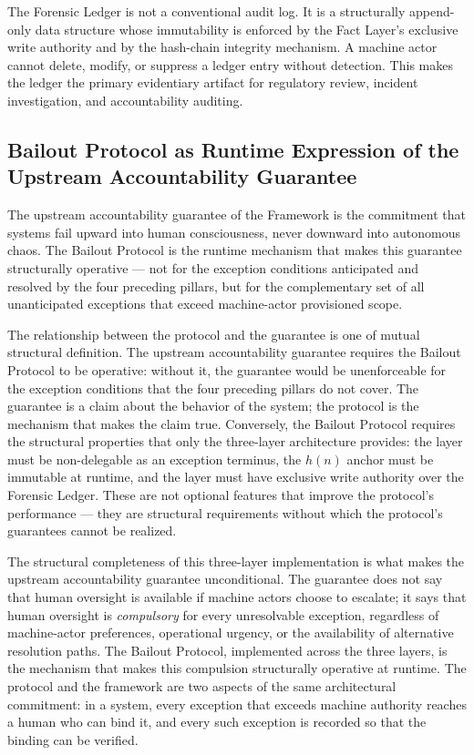 The Forensic Ledger is not a conventional audit log. It is a structurally append-only data structure whose immutability is enforced by the Fact Layer's exclusive write authority and by the hash-chain integrity mechanism. A machine actor cannot delete, modify, or suppress a ledger entry without detection. This makes the ledger the primary evidentiary artifact for regulatory review, incident investigation, and accountability auditing.

\subsection{Bailout Protocol as Runtime Expression of the Upstream Accountability Guarantee}\label{sec:runtime-expression}

The upstream accountability guarantee of the \bxthree{} Framework is the commitment that \bxthree{} systems fail upward into human consciousness, never downward into autonomous chaos. The Bailout Protocol is the runtime mechanism that makes this guarantee structurally operative — not for the exception conditions anticipated and resolved by the four preceding pillars, but for the complementary set of all unanticipated exceptions that exceed machine-actor provisioned scope.

The relationship between the protocol and the guarantee is one of mutual structural definition. The upstream accountability guarantee requires the Bailout Protocol to be operative: without it, the guarantee would be unenforceable for the exception conditions that the four preceding pillars do not cover. The guarantee is a claim about the behavior of the system; the protocol is the mechanism that makes the claim true. Conversely, the Bailout Protocol requires the structural properties that only the \bxthree{} three-layer architecture provides: the \purpose{} layer must be non-delegable as an exception terminus, the $h(n)$ anchor must be immutable at runtime, and the \fact{} layer must have exclusive write authority over the Forensic Ledger. These are not optional features that improve the protocol's performance — they are structural requirements without which the protocol's guarantees cannot be realized.

The structural completeness of this three-layer implementation is what makes the upstream accountability guarantee unconditional. The guarantee does not say that human oversight is available if machine actors choose to escalate; it says that human oversight is \emph{compulsory} for every unresolvable exception, regardless of machine-actor preferences, operational urgency, or the availability of alternative resolution paths. The Bailout Protocol, implemented across the three \bxthree{} layers, is the mechanism that makes this compulsion structurally operative at runtime. The protocol and the framework are two aspects of the same architectural commitment: in a \bxthree{} system, every exception that exceeds machine authority reaches a human who can bind it, and every such exception is recorded so that the binding can be verified.

